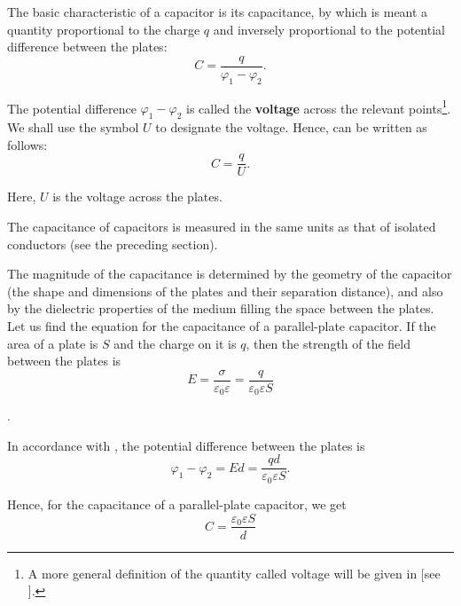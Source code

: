 The basic characteristic of a capacitor is its capacitance, by which is meant a quantity proportional to the charge $q$ and inversely proportional to the potential difference between the plates:
\begin{equation}\label{eq:3_10}
    C = \frac{q}{\varphi_1 - \varphi_2}.
\end{equation}

The potential difference $\varphi_1-\varphi_2$ is called the \textbf{voltage} across the relevant points\footnote{A more general definition of the quantity called voltage will be given in  [see ].}. We shall use the symbol $U$ to designate the voltage. Hence,  can be written as follows:
\begin{equation}\label{eq:3_11}
    C = \frac{q}{U}.
\end{equation}

\noindent
Here, $U$ is the voltage across the plates.

The capacitance of capacitors is measured in the same units as that of isolated conductors (see the preceding section).

The magnitude of the capacitance is determined by the geometry of the capacitor (the shape and dimensions of the plates and their separation distance), and also by the dielectric properties of the medium filling the space between the plates. Let us find the equation for the capacitance of a parallel-plate capacitor. If the area of a plate is $S$ and the charge on it is $q$, then the strength of the field between the plates is
\begin{equation*}
    E = \frac{\sigma}{\varepsilon_0 \varepsilon} = \frac{q}{\varepsilon_0 \varepsilon S}
\end{equation*}

.

In accordance with , the potential difference between the plates is
\begin{equation*}
    \varphi_1 - \varphi_2 = E d = \frac{q d}{\varepsilon_0 \varepsilon S}.
\end{equation*}

\noindent
Hence, for the capacitance of a parallel-plate capacitor, we get
\begin{equation}\label{eq:3_12}
    C = \frac{\varepsilon_0 \varepsilon S}{d}
\end{equation}

